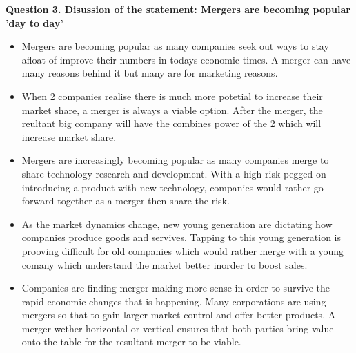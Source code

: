 \documentclass[12pt, a4]{article}
\begin{document}
\textbf{Question 3. Disussion of the statement: Mergers are becoming popular 'day to
day'}
\begin{itemize}
  
\item{Mergers are becoming popular as many companies seek out ways to stay afloat of
improve their numbers in todays economic times. A merger can have many reasons
behind it but many are for marketing reasons.}

\item{When 2 companies realise there is much more potetial to increase their market
share, a merger is always a viable option. After the merger, the reultant big
company will have the combines power of the 2 which will increase market share.}

\item{Mergers are increasingly becoming popular as many companies merge to share
technology research and development. With a high risk pegged on introducing a
product with new technology, companies would rather go forward together as a
merger then share the risk.}

\item{As the market dynamics change, new young generation are dictating how companies
produce goods and servives. Tapping to this young generation is prooving
difficult for old companies which would rather merge with a young comany which
understand the market better inorder to boost sales.}

\item{Companies are finding merger making more sense in order to survive the rapid
economic changes that is happening. Many corporations are using mergers so that
to gain larger market control and offer better products. A merger wether
horizontal or vertical ensures that both parties bring value onto the table for
the resultant merger to be viable.}

\end{itemize}
\end{document}
